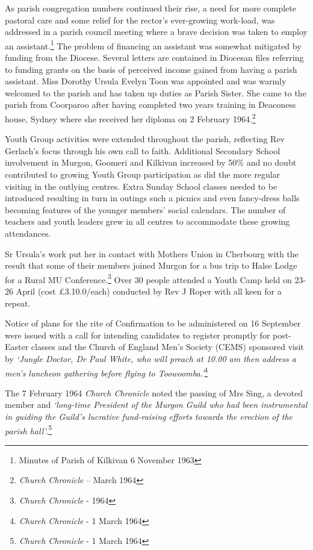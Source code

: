 As parish congregation numbers continued their rise, a need for more complete pastoral care and some relief for the rector's ever-growing work-load, was addressed in a parish council meeting where a brave decision was taken to employ an assistant.\footnote{Minutes of Parish of Kilkivan 6 November 1963} The problem of financing an assistant was somewhat mitigated by funding from the Diocese. Several letters are contained in Diocesan files referring to funding grants on the basis of perceived income gained from having a parish assistant. Miss Dorothy Ursula Evelyn Toon was appointed and was warmly welcomed to the parish and has taken up duties as Parish Sister. She came to the parish from Coorparoo after having completed two years training in Deaconess house, Sydney where she received her diploma on 2 February 1964.\footnote{\emph{Church Chronicle} -- March 1964}

Youth Group activities were extended throughout the parish, reflecting Rev Gerlach's focus through his own call to faith. Additional Secondary School involvement in Murgon, Goomeri and Kilkivan increased by 50\% and no doubt contributed to growing Youth Group participation as did the more regular visiting in the outlying centres. Extra Sunday School classes needed to be introduced resulting in turn in outings such a picnics and even fancy-dress balls becoming features of the younger members' social calendars. The number of teachers and youth leaders grew in all centres to accommodate these growing attendances.

Sr Ursula's work put her in contact with Mothers Union in Cherbourg with the result that some of their members joined Murgon for a bus trip to Halse Lodge for a Rural MU Conference.\footnote{\emph{Church Chronicle} - 1964} Over 30 people attended a Youth Camp held on 23-26 April (cost £3.10.0/each) conducted by Rev J Roper with all keen for a repeat.

Notice of plans for the rite of Confirmation to be administered on 16 September were issued with a call for intending candidates to register promptly for post-Easter classes and the Church of England Men's Society (CEMS) sponsored visit by \emph{`Jungle Doctor, Dr Paul White, who will preach at 10.00 am then address a men's luncheon gathering before flying to Toowoomba.'}\footnote{\emph{Church Chronicle} - 1 March 1964}

The 7 February 1964 \emph{Church Chronicle} noted the passing of Mrs Sing, a devoted member and \emph{`long-time President of the Murgon Guild who had been instrumental in guiding the Guild's lucrative fund-raising efforts towards the erection of the parish hall'}.\footnote{\emph{Church Chronicle} - 1 March 1964}

